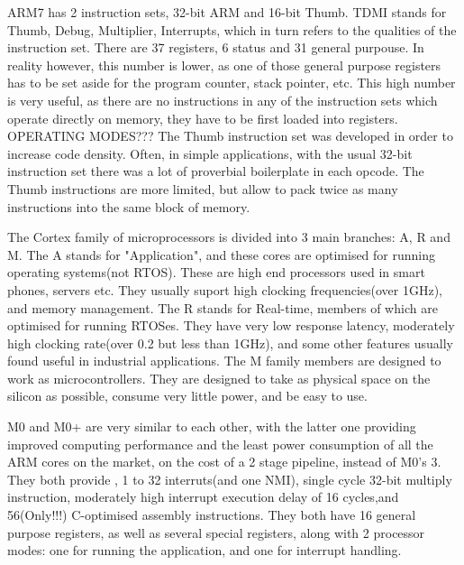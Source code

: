 \sol ARM7 has 2 instruction sets, 32-bit ARM and 16-bit Thumb. TDMI stands for Thumb, Debug, Multiplier, Interrupts, which
     in turn refers to the qualities of the instruction set.
     There are 37 registers, 6 status and 31 general purpouse. In reality however, this number is lower,
     as one of those general purpose registers has to be set aside for the program counter, stack pointer, etc.
     This high number is very useful, as there are no instructions in any of the instruction sets which operate
     directly on memory, they have to be first loaded into registers.
    OPERATING MODES???
   \sol  The Thumb instruction set was developed in order to increase code density. Often, in simple applications, with the usual 32-bit instruction
     set there was a lot of proverbial boilerplate in each opcode. The Thumb instructions are more limited, but allow to pack twice as many instructions
     into the same block of memory.

\sol The Cortex family of microprocessors is divided into 3 main branches: A, R and M.
     The A stands for "Application", and these cores are optimised for running
     operating systems(not RTOS). These are high end processors used in smart phones, servers
     etc. They usually suport high clocking frequencies(over 1GHz), and memory management.
     The R stands for Real-time, members of which are optimised for running RTOSes. They have
     very low response latency, moderately high clocking rate(over 0.2 but less than 1GHz), and
     some other features usually found useful in industrial applications.
     The M family members are designed to work as microcontrollers. They are designed to take 
     as physical space on the silicon as possible, consume very little power, and be easy
     to use.

\sol M0 and M0+ are very similar to each other, with the latter one providing improved computing performance and
     the least power consumption of all the ARM cores on the market, on the cost of a 2 stage pipeline, instead of M0's 3.
     They both provide , 1 to 32 interruts(and one NMI), single cycle 32-bit multiply instruction, moderately high interrupt execution delay of 16 cycles,and 56(Only!!!) C-optimised assembly instructions. They both have 16 general purpose registers, as well as several special registers, along with 2 processor modes: one for running the application, and one for interrupt handling.
     

